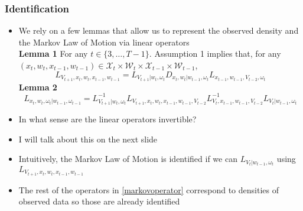 \documentclass{beamer}
\begin{document}
\begin{frame}
\frametitle{Identification}
\begin{itemize}
\item We rely on a few lemmas that allow us to represent the observed density and the Markov Law of Motion via linear operators\\
\textbf{Lemma 1}
For any $t\in\{3,\dots, T-1\}$. Assumption 1 implies that, for any $(x_{t}, w_{t}, x_{t-1}, w_{t-1})\in \mathcal{X}_{t}\times \mathcal{W}_{t}\times \mathcal{X}_{t-1}\times \mathcal{W}_{t-1}$,
\begin{equation}\label{obsoperator}
L_{V_{t+1},x_{t}, w_{t}, x_{t-1}, w_{t-1}}=L_{V_{t+1}|w_{t}, \omega_{t}}D_{x_{t}, w_{t}|w_{t-1}, \omega_{t}}L_{x_{t-1}, w_{t-1}, V_{t-2}, \omega_{t}}
\end{equation}
\textbf{Lemma 2}
\small
\begin{equation}\label{markovoperator}
L_{x_{t},w_{t},\omega_{t}|w_{t-1},\omega_{t-1}}=L^{-1}_{V_{t+1}|w_{t},\omega_{t}}L_{V_{t+1},x_{t},w_{t},x_{t-1}, w_{t-1}, V_{t-2}}L^{-1}_{V_{t},x_{t-1},w_{t-1},V_{t-2}}L_{V_{t}|w_{t-1},\omega_{t}}
\end{equation}
\item In what sense are the linear operators invertible?
\item I will talk about this on the next slide
\item Intuitively, the Markov Law of Motion is identified if we can $L_{V_{t}|w_{t-1},\omega_{t}}$ using $L_{V_{t+1},x_{t}, w_{t}, x_{t-1}, w_{t-1}}$
\item The rest of the operators in \eqref{markovoperator} correspond to densities of observed data so those are already identified
\end{itemize}
\end{frame}
\end{document}
